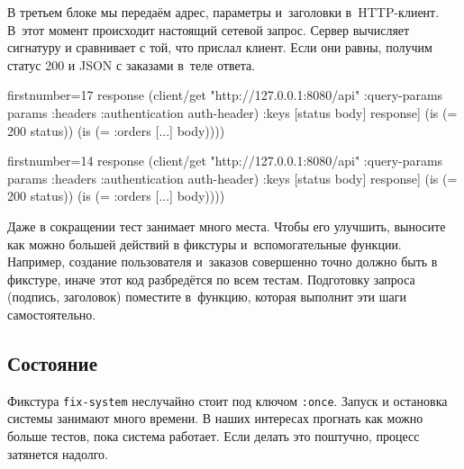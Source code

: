 \fi

В третьем блоке мы передаём адрес, параметры и~заголовки в~HTTP-клиент. В~этот
момент происходит настоящий сетевой запрос. Сервер вычисляет сигнатуру и
сравнивает с той, что прислал клиент. Если они равны, получим статус 200 и JSON
с заказами в~теле ответа.

\ifafive\vspace{15mm}\pagebreak[4]\fi

\ifnarrow

\begin{english}
  \begin{clojure/lines*}{firstnumber=17}
    response
    (client/get
      "http://127.0.0.1:8080/api"
      {:query-params params
       :headers {:authentication
                 auth-header}})
    {:keys [status body]} response]
(is (= 200 status))
(is (= {:orders [...]} body))))
  \end{clojure/lines*}
\end{english}

\else

\begin{english}
  \begin{clojure/lines*}{firstnumber=14}
        response
        (client/get "http://127.0.0.1:8080/api"
            {:query-params params
             :headers {:authentication auth-header}})
        {:keys [status body]} response]
    (is (= 200 status))
    (is (= {:orders [...]} body))))
  \end{clojure/lines*}
\end{english}

\fi

Даже в сокращении тест занимает много места. Чтобы его улучшить, выносите как
можно большей действий в фикстуры и~вспомогательные функции. Например, создание
пользователя и~заказов совершенно точно должно быть в фикстуре, иначе этот код
разбредётся по всем тестам. Подготовку запроса (подпись, заголовок) поместите
в~функцию, которая выполнит эти шаги самостоятельно.

\subsection{Состояние}

Фикстура \verb|fix-system| неслучайно стоит под ключом \verb|:once|. Запуск и
остановка системы занимают много времени. В наших интересах прогнать как можно
больше тестов, пока система работает. Если делать это поштучно, процесс
затянется надолго.

